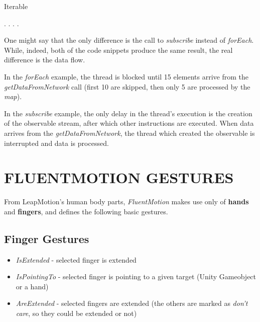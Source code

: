 \documentclass[chi_draft]{sigchi}
\def\fluentmotion{\textit{FluentMotion}}
\def\leap{LeapMotion}
\begin{document}
\begin{algorithm}
  \label{algorithm.Observable}
  \caption{Iterable}
  \begin{algorithmic}
    \State {}
      \State .
      \State .
      \State .
      \State .
  \end{algorithmic}
\end{algorithm}


One might say that the only difference is the call to \textit{subscribe} instead of \textit{forEach}. While, indeed, both of the code snippets produce the same result, the real difference is the data flow.


In the \textit{forEach} example, the thread is blocked until 15 elements arrive from the \textit{getDataFromNetwork} call (first 10 are skipped, then only 5 are processed by the \textit{map}).


In the \textit{subscribe} example, the only delay in the thread's execution is the creation of the observable stream, after which other instructions are executed. When data arrives from the \textit{getDataFromNetwork}, the thread which created the observable is interrupted and data is processed.


\section{FLUENTMOTION GESTURES}

From \leap{}'s human body parts, \fluentmotion{} makes use only of \textbf{hands} and \textbf{fingers}, and defines the following basic gestures.

\subsection{Finger Gestures}
\begin{itemize}
  \item \textit{IsExtended} - selected finger is extended
  \item \textit{IsPointingTo} - selected finger is pointing to a given target (Unity Gameobject or a hand)
  \item \textit{AreExtended} - selected fingers are extended (the others are marked as \textit{don't care}, so they could be extended or not)
\end{itemize}
\end{document}
